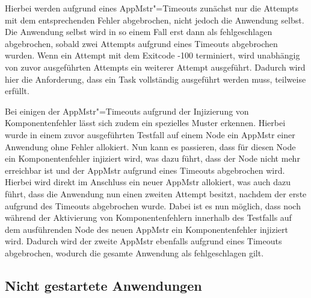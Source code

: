 Hierbei werden aufgrund eines \gls{AppMstr}"=Timeouts zunächst nur die Attempts mit dem entsprechenden Fehler abgebrochen, nicht jedoch die Anwendung selbst.
Die Anwendung selbst wird in so einem Fall erst dann als fehlgeschlagen abgebrochen, sobald zwei Attempts aufgrund eines Timeouts abgebrochen wurden.
Wenn ein Attempt mit dem Exitcode -100 terminiert, wird unabhängig von zuvor ausgeführten Attempts ein weiterer Attempt ausgeführt.
Dadurch wird hier die Anforderung, dass ein Task vollständig ausgeführt werden muss, teilweise erfüllt.

Bei einigen der \gls{AppMstr}"=Timeouts aufgrund der Injizierung von Komponentenfehler lässt sich zudem ein spezielles Muster erkennen.
Hierbei wurde in einem zuvor ausgeführten Testfall auf einem Node ein \gls{AppMstr} einer Anwendung ohne Fehler allokiert.
Nun kann es passieren, dass für diesen Node ein Komponentenfehler injiziert wird, was dazu führt, dass der Node nicht mehr erreichbar ist und der \gls{AppMstr} aufgrund eines Timeouts abgebrochen wird.
Hierbei wird direkt im Anschluss ein neuer \gls{AppMstr} allokiert, was auch dazu führt, dass die Anwendung nun einen zweiten Attempt besitzt, nachdem der erste aufgrund des Timeouts abgebrochen wurde.
Dabei ist es nun möglich, dass noch während der Aktivierung von Komponentenfehlern innerhalb des Testfalls auf dem ausführenden Node des neuen \gls{AppMstr} ein Komponentenfehler injiziert wird.
Dadurch wird der zweite \gls{AppMstr} ebenfalls aufgrund eines Timeouts abgebrochen, wodurch die gesamte Anwendung als fehlgeschlagen gilt.

\subsection{Nicht gestartete Anwendungen}
\label{subsec:notStartedApps}

